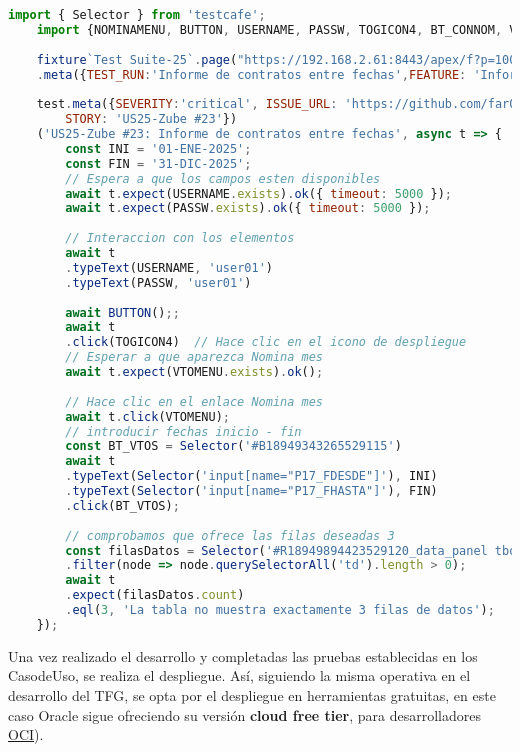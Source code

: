 \begin{lstlisting}[language=JavaScript, caption={Codigo en js para prueba en TestCafe}]
	import { Selector } from 'testcafe';
	import {NOMINAMENU, BUTTON, USERNAME, PASSW, TOGICON4, BT_CONNOM, VTOMENU } from './constanst.js';
	
	fixture`Test Suite-25`.page("https://192.168.2.61:8443/apex/f?p=100:LOGIN_DESKTOP:12651011480748:::::")
	.meta({TEST_RUN:'Informe de contratos entre fechas',FEATURE: 'Informes', STORY: 'US25-Zube #23'});
	
	test.meta({SEVERITY:'critical', ISSUE_URL: 'https://github.com/far0010/TFGUBU-Fran_Arroyo/issues/16',
		STORY: 'US25-Zube #23'})
	('US25-Zube #23: Informe de contratos entre fechas', async t => {
		const INI = '01-ENE-2025'; 
		const FIN = '31-DIC-2025';
		// Espera a que los campos esten disponibles
		await t.expect(USERNAME.exists).ok({ timeout: 5000 });
		await t.expect(PASSW.exists).ok({ timeout: 5000 });
		
		// Interaccion con los elementos
		await t
		.typeText(USERNAME, 'user01')
		.typeText(PASSW, 'user01')
		
		await BUTTON();;
		await t
		.click(TOGICON4)  // Hace clic en el icono de despliegue
		// Esperar a que aparezca Nomina mes
		await t.expect(VTOMENU.exists).ok();
		
		// Hace clic en el enlace Nomina mes
		await t.click(VTOMENU);
		// introducir fechas inicio - fin
		const BT_VTOS = Selector('#B18949343265529115')
		await t
		.typeText(Selector('input[name="P17_FDESDE"]'), INI)
		.typeText(Selector('input[name="P17_FHASTA"]'), FIN)
		.click(BT_VTOS);
		
		// comprobamos que ofrece las filas deseadas 3
		const filasDatos = Selector('#R18949894423529120_data_panel tbody tr')
		.filter(node => node.querySelectorAll('td').length > 0);
		await t
		.expect(filasDatos.count)
		.eql(3, 'La tabla no muestra exactamente 3 filas de datos');        
	});
\end{lstlisting}


Una vez realizado el desarrollo y completadas las pruebas establecidas en los \gls{CasodeUso}, se realiza el despliegue. Así, siguiendo la misma operativa en el desarrollo del \acrshort{TFG}, se opta por el despliegue en herramientas gratuitas, en este caso Oracle sigue ofreciendo su versión \textbf{cloud free tier}, para desarrolladores \href{https://www.oracle.com/es/cloud/free/}{\acrfull{OCI}}).

